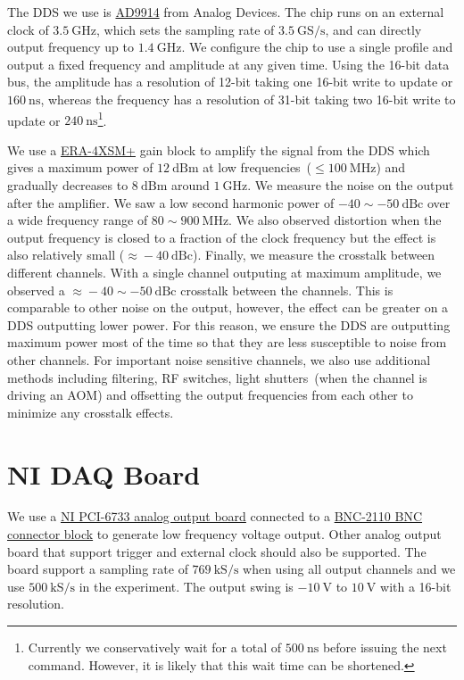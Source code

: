 The DDS we use is \href{https://www.analog.com/en/products/ad9914.html}{AD9914}
from Analog Devices.
The chip runs on an external clock of $3.5~\mathrm{GHz}$,
which sets the sampling rate of $3.5~\mathrm{GS/s}$,
and can directly output frequency up to $1.4~\mathrm{GHz}$.
We configure the chip to use a single profile and output a fixed frequency and amplitude
at any given time.
Using the 16-bit data bus,
the amplitude has a resolution of 12-bit taking one 16-bit write to update or $160~\mathrm{ns}$,
whereas the frequency has a resolution of 31-bit
taking two 16-bit write to update or $240~\mathrm{ns}$\footnote{
  Currently we conservatively wait for a total of $500~\mathrm{ns}$
  before issuing the next command.
  However, it is likely that this wait time can be shortened.
}.

We use a \href{https://www.minicircuits.com/WebStore/dashboard.html?model=ERA-4XSM\%2B}{ERA-4XSM+}
gain block to amplify the signal from the DDS which gives a maximum power of $12~\mathrm{dBm}$
at low frequencies~($\leqslant\!100~\mathrm{MHz}$) and gradually decreases to $8~\mathrm{dBm}$
around $1~\mathrm{GHz}$.
We measure the noise on the output after the amplifier.
We saw a low second harmonic power of $-40\sim-50~\mathrm{dBc}$
over a wide frequency range of $80\sim900~\mathrm{MHz}$.
We also observed distortion when the output frequency is closed to
a fraction of the clock frequency but the effect is also relatively small
($\approx\!-40~\mathrm{dBc}$).
Finally, we measure the crosstalk between different channels.
With a single channel outputing at maximum amplitude,
we observed a $\approx\!-40\sim-50~\mathrm{dBc}$ crosstalk between the channels.
This is comparable to other noise on the output, however,
the effect can be greater on a DDS outputting lower power.
For this reason, we ensure the DDS are outputting maximum power most of the time
so that they are less susceptible to noise from other channels.
For important noise sensitive channels,
we also use additional methods including filtering, RF switches,
light shutters~(when the channel is driving an AOM)
and offsetting the output frequencies from each other to minimize any crosstalk effects.

\section{NI DAQ Board}
\label{appendex:computer-control:nidaq}

We use a \href{https://www.ni.com/en-us/support/model.pci-6733.html}
{NI PCI-6733 analog output board} connected to a
\href{https://www.ni.com/en-us/support/model.bnc-2110.html}{BNC-2110 BNC connector block}
to generate low frequency voltage output.
Other analog output board that support trigger and external clock should also be supported.
The board support a sampling rate of $769~\mathrm{kS/s}$ when using all output channels
and we use $500~\mathrm{kS/s}$ in the experiment.
The output swing is $-10~\mathrm{V}$ to $10~\mathrm{V}$ with a 16-bit resolution.

